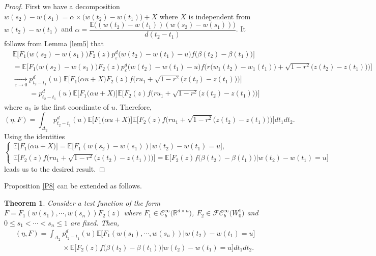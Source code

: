 \documentclass[]{interact}
\newcommand{\E}{{\mathbb{E}}}
\newcommand{\R}{{\mathbb{R}}}
\newcommand{\1}{\mathbf{1}}
\newcommand{\ve}{\varepsilon}
\theoremstyle{plain}%
\newtheorem{thm}{Theorem}[section]
\theoremstyle{definition}
\theoremstyle{remark}
\begin{document}
\begin{proof}
First we have a decomposition $ w(s_2)-w(s_1)=\alpha\times \big(w(t_2)-w(t_1)\big)+X  $ where $X$ is independent from $w(t_2)-w(t_1)$ and $\alpha= \dfrac{\E\big((w(t_2)-w(t_1))(w(s_2)-w(s_1))\big) }{d(t_2-t_1)} $.
It follows from Lemma \ref{lem5} that 
\begin{align*}
&\E \Big[ F_1\big( w(s_2)-w(s_1) \big) F_2(z)p_\ve ^d\big( w(t_2)-w(t_1)-u\big) f\big( \beta(t_2)-\beta(t_1)\big )\Big]\\
&=\E \Big[ F_1\big( w(s_2)-w(s_1) \big) F_2(z)p_\ve ^d\big( w(t_2)-w(t_1)-u\big) f\big( r\big( w_1(t_2)-w_1(t_1)\big)+\sqrt{1-r^2} \big( z(t_2)-z(t_1)\big)\big )\Big]\\
&\xrightarrow[ \varepsilon \to 0]{} p_{t_2-t_1}^d(u) \E \Big[ F_1\big( \alpha u+X \big) F_2(z)f\big( ru_1+\sqrt{1-r^2} \big( z(t_2)-z(t_1)\big)\big )\Big]\\
&\phantom{\xrightarrow[ \varepsilon \to 0]{}}= p_{t_2-t_1}^d(u) \E \Big[ F_1\big( \alpha u+X \big)\Big] \E \Big[ F_2(z)f\big( ru_1+\sqrt{1-r^2} \big( z(t_2)-z(t_1)\big)\big )\Big]
\end{align*}
where $u_1$ is the  first coordinate of $u$. Therefore,
$$( \eta, F )= \int_{\Delta_2  } p_{t_2-t_1}^d(u) \E \Big[ F_1\big( \alpha u+X \big)\Big] \E \Big[ F_2(z)f\big( ru_1+\sqrt{1-r^2} \big( z(t_2)-z(t_1)\big)\big )\Big] dt_1dt_2.$$
Using the identities
$$\begin{cases}
\E \Big[ F_1\big( \alpha u+X \big)\Big]=\E \Big[F_1(w(s_2)-w(s_1))\Big | w(t_2)-w(t_1)=u\Big],\\
\E \Big[ F_2(z)f\big( ru_1+\sqrt{1-r^2} \big( z(t_2)-z(t_1)\big)\big )\Big]=\E \Big[F_2(z)f\big( \beta(t_2)-\beta(t_1)\big )\Big | w(t_2)-w(t_1)=u\Big]
\end{cases}$$ 
leads us to the desired result.
\end{proof}

Proposition \ref{P8} can be extended as follows.

\begin{thm}
Consider a test function of the form $F=F_1(w(s_1),\cdots,w(s_n))F_2(z)$ where $F_1\in \mathcal{C}_b^{\infty} \big( \R^{d\times n} \big)$, $F_2\in \mathcal{FC}_b^{\infty} \big( W_0^1 \big)$ and $0\leqslant s_1<\cdots <s_n \leqslant 1$ are fixed. Then, 
\begin{align*}
&( \eta, F )= \int_{\Delta_2  } p_{t_2-t_1}^d(u)\E \Big[F_1(w(s_1),\cdots,w(s_n))\Big | w(t_2)-w(t_1)=u\Big]\\
&\phantom{( \eta, F )= \int_{\Delta_2  }} \times \E \Big[F_2(z)f\big( \beta(t_2)-\beta(t_1)\big )\Big | w(t_2)-w(t_1)=u\Big] dt_1dt_2. 
\end{align*} 
\end{thm}
\end{document}

